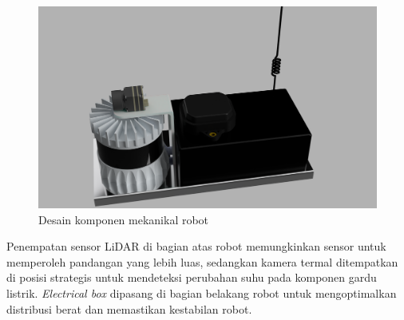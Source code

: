 \begin{figure}[H]
  \centering
  \includegraphics[scale=0.11]{gambar/mechanical_design.png}
  \caption{Desain komponen mekanikal robot}
  \label{fig:DesignMekanikalRobot}
\end{figure}

Penempatan sensor LiDAR di bagian atas robot memungkinkan sensor untuk memperoleh pandangan yang lebih luas, sedangkan kamera termal ditempatkan di posisi strategis untuk mendeteksi perubahan suhu pada komponen gardu listrik. \emph{Electrical box} dipasang di bagian belakang robot untuk mengoptimalkan distribusi berat dan memastikan kestabilan robot.


